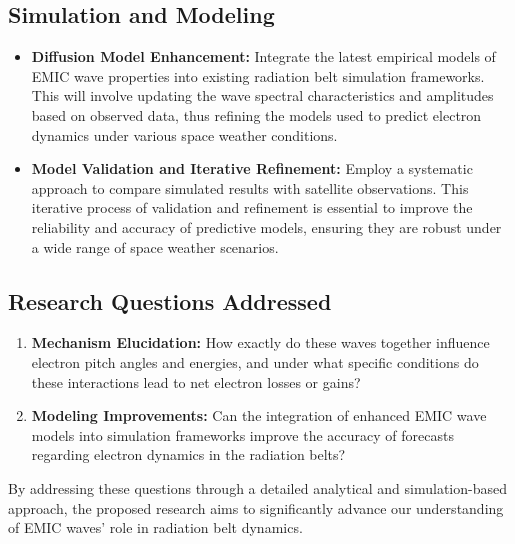 \documentclass[
  letterpaper,
  DIV=11,
  numbers=noendperiod]{scrartcl}
\providecommand{\tightlist}{%
  \setlength{\itemsep}{0pt}\setlength{\parskip}{0pt}}\usepackage{longtable,booktabs,array}
\begin{document}
\subsection{Simulation and Modeling}\label{simulation-and-modeling}

\begin{itemize}
\tightlist
\item
  \textbf{Diffusion Model Enhancement:} Integrate the latest empirical models of EMIC wave properties into existing radiation belt simulation frameworks. This will involve updating the wave spectral characteristics and amplitudes based on observed data, thus refining the models used to predict electron dynamics under various space weather conditions.
\end{itemize}

\begin{itemize}
\tightlist
\item
  \textbf{Model Validation and Iterative Refinement:} Employ a systematic approach to compare simulated results with satellite observations. This iterative process of validation and refinement is essential to improve the reliability and accuracy of predictive models, ensuring they are robust under a wide range of space weather scenarios.
\end{itemize}

\subsection{Research Questions Addressed}\label{research-questions-addressed}

\begin{enumerate}
\def\labelenumi{\arabic{enumi}.}
\tightlist
\item
  \textbf{Mechanism Elucidation:} How exactly do these waves together influence electron pitch angles and energies, and under what specific conditions do these interactions lead to net electron losses or gains?
\item
  \textbf{Modeling Improvements:} Can the integration of enhanced EMIC wave models into simulation frameworks improve the accuracy of forecasts regarding electron dynamics in the radiation belts?
\end{enumerate}

By addressing these questions through a detailed analytical and simulation-based approach, the proposed research aims to significantly advance our understanding of EMIC waves' role in radiation belt dynamics.
\end{document}
